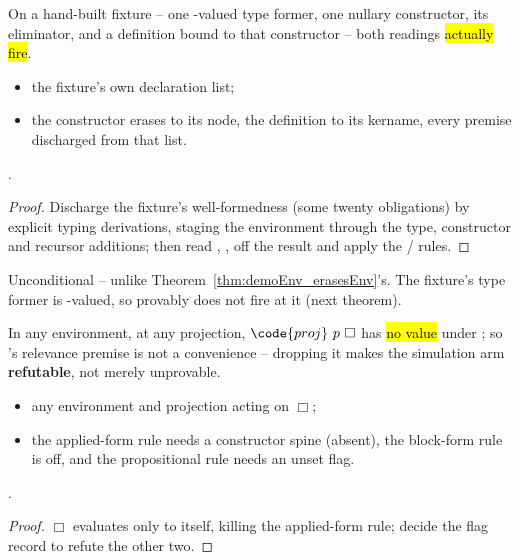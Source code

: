 \begin{theorem}
\label{thm:erases_ctor_fires}
\leanok
{}
 On a hand-built fixture -- one -valued type former, one nullary constructor, its eliminator, and a definition bound to that constructor -- both readings \hl{actually fire}.
\begin{itemize}
\item {} the fixture's own declaration list;
\item {} the constructor erases to its \lbox{} node, the definition to its kername, every premise discharged from that list.
\end{itemize}
 \stProved{}.
\end{theorem}
\begin{proof}
\leanok
{}
 Discharge the fixture's well-formedness (some twenty obligations) by explicit
typing derivations, staging the environment through the type, constructor and recursor
additions; then read , ,  off the
result and apply the / rules.
\end{proof}

\begin{remark}
 Unconditional -- unlike Theorem~\ref{thm:demoEnv_erasesEnv}'s. The fixture's type former is -valued, so  provably does not fire at it (next theorem).
\end{remark}

\begin{theorem}
\label{thm:erases_proj_needs_informative}
\leanok
{}
 In any \lbox{} environment, at any projection, $\code{proj}\ p\ \Box$ has \hl{no value} under ; so 's relevance premise is not a convenience -- dropping it makes the simulation arm \textbf{refutable}, not merely unprovable.
\begin{itemize}
\item {} any environment and projection acting on $\Box$;
\item {} the applied-form rule needs a constructor spine (absent), the block-form rule is off, and the propositional rule needs an unset flag.
\end{itemize}
 \stProved{}.
\end{theorem}
\begin{proof}
\leanok
{}
 $\Box$ evaluates only to itself, killing the applied-form rule; decide the flag record to refute the other two.
\end{proof}

